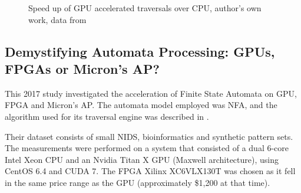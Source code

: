 \documentclass[10pt,onecolumn,twoside,english,a4paper]{article}
\begin{document}
\begin{figure}[h!]
  \centering
  \caption{Speed up of GPU accelerated traversals over CPU, author's own work, data from \cite{Becchi:regex_large_dataset}}
  \label{speedup:becchi}
\end{figure}

\subsection{Demystifying Automata Processing: GPUs, FPGAs or Micron's AP?} \label{Nourian:DemystifyingFSA_analysis}
This 2017 study\cite{Nourian:DemystifyingFSA} investigated the acceleration of Finite State Automata on GPU, FPGA and Micron's AP. The automata model employed was NFA, and the algorithm used for its traversal engine was described in \cite{van2012designing}.

Their dataset consists of small NIDS, bioinformatics and synthetic pattern sets.
The measurements were performed on a system that consisted of a dual 6-core Intel Xeon CPU and an Nvidia Titan X GPU (Maxwell architecture), using CentOS 6.4 and CUDA 7. The FPGA Xilinx XC6VLX130T was chosen as it fell in the same price range as the GPU (approximately \$1,200 at that time).
\end{document}
